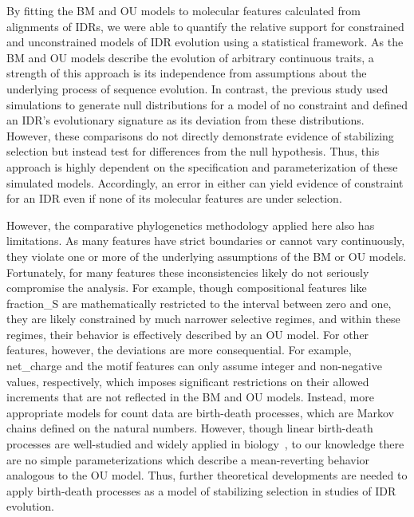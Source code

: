 By fitting the BM and OU models to molecular features calculated from alignments of IDRs, we were able to quantify the relative support for constrained and unconstrained models of IDR evolution using a statistical framework. As the BM and OU models describe the evolution of arbitrary continuous traits, a strength of this approach is its independence from assumptions about the underlying process of sequence evolution. In contrast, the previous study used simulations to generate null distributions for a model of no constraint and defined an IDR's evolutionary signature as its deviation from these distributions. However, these comparisons do not directly demonstrate evidence of stabilizing selection but instead test for differences from the null hypothesis. Thus, this approach is highly dependent on the specification and parameterization of these simulated models. Accordingly, an error in either can yield evidence of constraint for an IDR even if none of its molecular features are under selection.

However, the comparative phylogenetics methodology applied here also has limitations. As many features have strict boundaries or cannot vary continuously, they violate one or more of the underlying assumptions of the BM or OU models. Fortunately, for many features these inconsistencies likely do not seriously compromise the analysis. For example, though compositional features like fraction\_S are mathematically restricted to the interval between zero and one, they are likely constrained by much narrower selective regimes, and within these regimes, their behavior is effectively described by an OU model. For other features, however, the deviations are more consequential. For example, net\_charge and the motif features can only assume integer and non-negative values, respectively, which imposes significant restrictions on their allowed increments that are not reflected in the BM and OU models. Instead, more appropriate models for count data are birth-death processes, which are Markov chains defined on the natural numbers. However, though linear birth-death processes are well-studied and widely applied in biology~\cite{Crawford2011}, to our knowledge there are no simple parameterizations which describe a mean-reverting behavior analogous to the OU model. Thus, further theoretical developments are needed to apply birth-death processes as a model of stabilizing selection in studies of IDR evolution.

